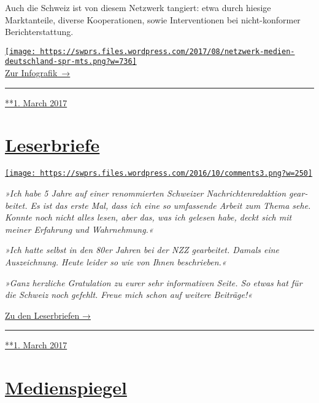 Auch die Schweiz ist von diesem Netzwerk tangiert: etwa durch hiesige
Marktanteile, diverse Kooperationen, sowie Interventionen bei
nicht-konformer Berichterstattung.

\href{https://swprs.org/netzwerk-medien-deutschland/}{\texttt{[image: https://swprs.files.wordpress.com/2017/08/netzwerk-medien-deutschland-spr-mts.png?w=736]}\\
Zur Infografik~→}

\begin{center}\rule{0.5\linewidth}{\linethickness}\end{center}

\href{https://swprs.org/2017/03/01/medien-in-deutschland/}{**1. March
2017}

\hypertarget{leserbriefe}{%
\section{\texorpdfstring{\href{https://swprs.org/2017/03/01/leserbriefe/}{Leserbriefe}}{Leserbriefe}}\label{leserbriefe}}

\href{https://swprs.org/2017/03/01/leserbriefe/}{\texttt{[image: https://swprs.files.wordpress.com/2016/10/comments3.png?w=250]}}

\emph{»Ich habe 5 Jahre auf einer renom­mier­ten Schweizer
Nachrichten­redaktion ge­ar­bei­tet. Es ist das erste Mal, dass ich eine
so umfassende Arbeit zum Thema sehe. Konnte noch nicht alles lesen, aber
das, was ich gelesen habe, deckt sich mit meiner Erfahrung und
Wahr­nehmung.«}

\emph{»Ich hatte selbst in den 80er Jahren bei der NZZ gearbeitet.
Damals eine Auszeichnung. Heute leider so wie von Ihnen beschrieben.«}

\emph{»Ganz herzliche Gratulation zu eurer sehr infor­ma­tiven Seite. So
etwas hat für die Schweiz noch gefehlt. Freue mich schon auf weitere
Beiträge!«}

\href{https://swprs.org/leserbriefe/}{Zu den Leserbriefen →}

\begin{center}\rule{0.5\linewidth}{\linethickness}\end{center}

\href{https://swprs.org/2017/03/01/leserbriefe/}{**1. March 2017}

\hypertarget{medienspiegel}{%
\section{\texorpdfstring{\href{https://swprs.org/2017/03/01/medienspiegel/}{Medienspiegel}}{Medienspiegel}}\label{medienspiegel}}

